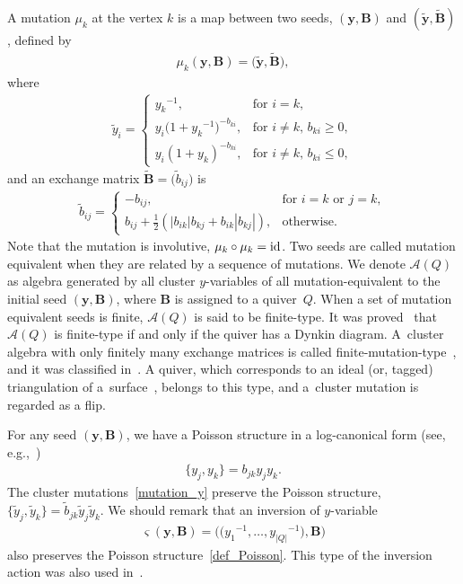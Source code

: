 \documentclass[pdftex]{sigma}
\numberwithin{equation}{section}
\begin{document}
A mutation $\mu_k$ at the vertex $k$ is a map between two seeds, $(\boldsymbol{y}, \mathbf{B})$ and $(\widetilde{\boldsymbol{y}}, \widetilde{\mathbf{B}})$, defined by
\begin{gather} \label{mutation_y}
 \mu_k( \boldsymbol{y}, \mathbf{B}) = \big(\widetilde{\boldsymbol{y}} , \widetilde{\mathbf{B}}\big) ,
\end{gather}
where
\begin{gather*}
 \widetilde{y}_i
 =
 \begin{cases}
 {y_k}^{-1} , & \text{for $i=k$}, \\
 y_i \big( 1+{y_k}^{-1} \big)^{-b_{ki}} , & \text{for $i \neq k$, $b_{ki} \geq 0$}, \\
 y_i ( 1+y_k )^{-b_{ki}} , & \text{for $i \neq k$, $b_{ki} \leq 0$},
 \end{cases}
\end{gather*}
and
an exchange matrix $ \widetilde{\mathbf{B}}= \big( \widetilde{b}_{ij} \big)$ is
\begin{gather} \label{mutation_B}
 \widetilde{b}_{ij} =
 \begin{cases}
 - b_{ij} , & \text{for $i=k$ or $j=k$}, \\
 b_{ij}+ \frac{1}{2} ( | b_{ik} | b_{kj} + b_{ik} | b_{kj} | ) , & \text{otherwise}.
 \end{cases}
\end{gather}
Note that the mutation is involutive, $\mu_k \circ \mu_k={\rm id}$. Two seeds are called mutation equivalent when they are related by a sequence of mutations. We denote $\mathcal{A}(Q)$ as algebra generated by all cluster
$y$-variables of all mutation-equivalent to the initial seed $(\boldsymbol{y}, \mathbf{B})$, where $\mathbf{B}$ is assigned to a quiver~$Q$. When a set of mutation equivalent seeds is finite, $\mathcal{A}(Q)$ is said to be
finite-type. It was proved~\cite{FominZelev03a} that $\mathcal{A}(Q)$ is finite-type if and only if the quiver has a Dynkin diagram. A~cluster algebra with only finitely many exchange matrices is called finite-mutation-type~\cite{FomiShapThur08a}, and it was classified in~\cite{FeliShapTuma12c}. A quiver, which corresponds to an ideal (or, tagged) triangulation of a~surface~\cite{FomiShapThur08a}, belongs to this type, and
a~cluster mutation is regarded as a flip.

For any seed $(\boldsymbol{y}, \mathbf{B})$, we have a Poisson structure in a log-canonical form (see, e.g.,~\cite{GekhShapVain10Book})
\begin{gather} \label{def_Poisson}
\{ y_j , y_k \} = b_{jk} y_j y_k .
\end{gather}
The cluster mutations~\eqref{mutation_y} preserve the Poisson structure, $\big\{ \widetilde{y}_j , \widetilde{y}_k\big\} =\widetilde{b}_{jk} \widetilde{y}_j \widetilde{y}_k$. We should remark that an inversion of $y$-variable
\begin{gather} \label{inversion_cluster}
 \varsigma(\boldsymbol{y}, \mathbf{B}) = \big(\big ({y_1}^{-1}, \dots, {y_{|Q|}}^{-1}\big), \mathbf{B} \big)
\end{gather}
also preserves the Poisson structure~\eqref{def_Poisson}. This type of the inversion action was also used in~\cite{BersGavrMars18a}.
\end{document}
